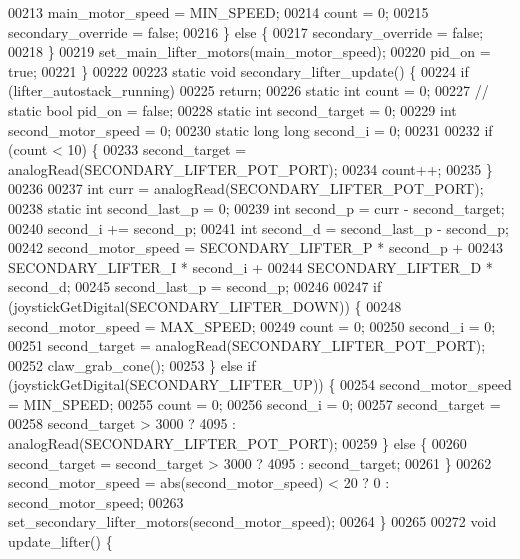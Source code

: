 \begin{DoxyCode}
{{{00213     main\_motor\_speed = MIN\_SPEED;
00214     count = 0;
00215     secondary_override = \textcolor{keyword}{false};
00216   \} \textcolor{keywordflow}{else} \{
00217     secondary_override = \textcolor{keyword}{false};
00218   \}
00219   set_main_lifter_motors(main\_motor\_speed);
00220   pid\_on = \textcolor{keyword}{true};
00221 \}
00222 
00223 \textcolor{keyword}{static} \textcolor{keywordtype}{void} secondary_lifter_update() \{
00224   \textcolor{keywordflow}{if} (lifter_autostack_running)
00225     \textcolor{keywordflow}{return};
00226   \textcolor{keyword}{static} \textcolor{keywordtype}{int} count = 0;
00227   \textcolor{comment}{// static bool pid\_on = false;}
00228   \textcolor{keyword}{static} \textcolor{keywordtype}{int} second\_target = 0;
00229   \textcolor{keywordtype}{int} second\_motor\_speed = 0;
00230   \textcolor{keyword}{static} \textcolor{keywordtype}{long} \textcolor{keywordtype}{long} second\_i = 0;
00231 
00232   \textcolor{keywordflow}{if} (count < 10) \{
00233     second\_target = analogRead(SECONDARY\_LIFTER\_POT\_PORT);
00234     count++;
00235   \}
00236 
00237   \textcolor{keywordtype}{int} curr = analogRead(SECONDARY\_LIFTER\_POT\_PORT);
00238   \textcolor{keyword}{static} \textcolor{keywordtype}{int} second\_last\_p = 0;
00239   \textcolor{keywordtype}{int} second\_p = curr - second\_target;
00240   second\_i += second\_p;
00241   \textcolor{keywordtype}{int} second\_d = second\_last\_p - second\_p;
00242   second\_motor\_speed = SECONDARY\_LIFTER\_P * second\_p +
00243                        SECONDARY\_LIFTER\_I * second\_i +
00244                        SECONDARY\_LIFTER\_D * second\_d;
00245   second\_last\_p = second\_p;
00246 
00247   \textcolor{keywordflow}{if} (joystickGetDigital(SECONDARY\_LIFTER\_DOWN)) \{
00248     second\_motor\_speed = MAX\_SPEED;
00249     count = 0;
00250     second\_i = 0;
00251     second\_target = analogRead(SECONDARY\_LIFTER\_POT\_PORT);
00252     claw_grab_cone();
00253   \} \textcolor{keywordflow}{else} \textcolor{keywordflow}{if} (joystickGetDigital(SECONDARY\_LIFTER\_UP)) \{
00254     second\_motor\_speed = MIN\_SPEED;
00255     count = 0;
00256     second\_i = 0;
00257     second\_target =
00258         second\_target > 3000 ? 4095 : analogRead(SECONDARY\_LIFTER\_POT\_PORT);
00259   \} \textcolor{keywordflow}{else} \{
00260     second\_target = second\_target > 3000 ? 4095 : second\_target;
00261   \}
00262   second\_motor\_speed = abs(second\_motor\_speed) < 20 ? 0 : second\_motor\_speed;
00263   set_secondary_lifter_motors(second\_motor\_speed);
00264 \}
00265 
00272 \textcolor{keywordtype}{void} update_lifter() \{
}}}
\end{DoxyCode}
